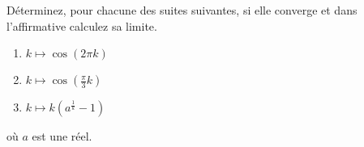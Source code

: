 
\begin{exercice}\label{exo0026}


Déterminez, pour chacune des suites suivantes, si elle converge
et dans l'affirmative calculez sa limite.
\begin{enumerate}
\item $ k \mapsto  \cos( 2 \pi k) $
\item $ k \mapsto  \cos(\frac{\pi}{3} k) $
\item $ k \mapsto  k(a ^\frac{1}{k} -1 ) $
\end{enumerate}
où $a$ est une réel.
%
%

\end{exercice}
